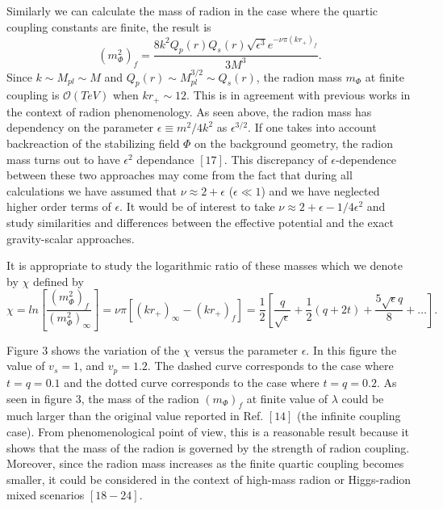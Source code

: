 \documentclass[12pt]{article}
\begin{document}
Similarly we can calculate the mass of radion in the case where the
quartic coupling constants are finite, the result is
\begin{equation}
(m^2_\Phi)_f=\frac{8k^2 Q_p(r) Q_s(r) \sqrt{\epsilon^3}e^{-\nu \pi
(kr_+)_f}}{3M^3}.
\end{equation}
Since $k \sim M_{pl} \sim M$ and $Q_p(r) \sim M_{pl}^{3/2} \sim Q_s(r)$, the radion mass $m_{\Phi}$ at finite coupling is $\mathcal{O}(TeV)$ when $kr_{+}\sim12$. This is in agreement with previous works in the context of radion phenomenology. As seen above, the radion mass has dependency on the parameter $\epsilon\equiv m^{2}/4k^{2}$ as $\epsilon^{3/2}$. If one takes into account backreaction of
the stabilizing field $\Phi$ on the background geometry, the radion mass turns out to
have $\epsilon^{2}$ dependance $[17]$. This discrepancy
of $\epsilon$-dependence between these two approaches may come from the fact that during all calculations we have assumed that $\nu\approx2+\epsilon$ ($\epsilon\ll1$) and we have neglected higher order terms of $\epsilon$. It would be of interest to take $\nu\approx2+\epsilon-1/4\epsilon^{2}$ and study similarities and differences between the effective potential and the exact gravity-scalar approaches.


It is appropriate to study the logarithmic ratio of these masses
which we denote by $\chi$ defined by
\begin{equation}
\chi=ln[\frac{(m^2_\Phi)_f}{(m^2_\Phi)_\infty}]=\nu\pi
[(kr_+)_\infty-(kr_+)_f]=\frac{1}{2}[\frac{q}{\sqrt{\epsilon}}+\frac{1}{2}(q+2t)+
\frac{5\sqrt{\epsilon}q}{8}+\ldots].
\end{equation}



 Figure $3$ shows the variation of the  $\chi$ versus the
parameter $\epsilon$. In this figure the value of $v_s=1$, and
$v_p=1.2$.
 The dashed
curve corresponds to the case where $t=q=0.1$ and the
dotted curve corresponds to the case where $t=q=0.2$. As seen in figure $3$, the mass of the radion $(m_\Phi)_f$ at finite value of
$\lambda$ could be much larger than the original value
reported in Ref. $[14]$ (the infinite coupling case). From phenomenological point of view, this is a reasonable result because it shows that the mass of the radion is governed by the strength of radion coupling. Moreover, since the radion mass increases as the finite quartic coupling becomes smaller, it could be considered in the context of high-mass radion or Higgs-radion mixed scenarios $[18-24]$.
\end{document}
